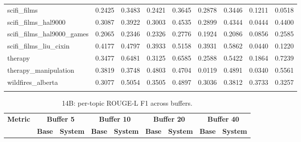 \begin{landscape}
\begin{longtable}{@{}p{3.8cm}cccccccc@{}}
scifi\_films & 0.2425 & 0.3483 & 0.2421 & 0.3645 & 0.2878 & 0.3446 & 0.1211 & 0.0518 \\
scifi\_films\_hal9000 & 0.3087 & 0.3922 & 0.3003 & 0.4535 & 0.2899 & 0.4344 & 0.0444 & 0.4400 \\
scifi\_films\_hal9000\_games & 0.2065 & 0.2346 & 0.2326 & 0.2776 & 0.1924 & 0.2086 & 0.0856 & 0.2585 \\
scifi\_films\_liu\_cixin & 0.4177 & 0.4797 & 0.3933 & 0.5158 & 0.3931 & 0.5862 & 0.0440 & 0.1220 \\
therapy & 0.3477 & 0.6481 & 0.3125 & 0.6585 & 0.2588 & 0.5422 & 0.1864 & 0.7239 \\
therapy\_manipulation & 0.3819 & 0.3748 & 0.4803 & 0.4704 & 0.0119 & 0.4891 & 0.0340 & 0.5561 \\
wildfires\_alberta & 0.3077 & 0.5054 & 0.3505 & 0.4897 & 0.3036 & 0.3812 & 0.3733 & 0.3257 \\
\botrule
\end{longtable}
\begin{longtable}{@{}p{3.8cm}cccccccc@{}}
\caption{14B: per-topic ROUGE-L F1 across buffers.}\label{tab:app_14b_rougel_topics}\\

\toprule
\textbf{Metric} & \multicolumn{2}{c}{\textbf{Buffer 5}} & \multicolumn{2}{c}{\textbf{Buffer 10}} & \multicolumn{2}{c}{\textbf{Buffer 20}} & \multicolumn{2}{c}{\textbf{Buffer 40}} \\
\cmidrule(lr){2-3}\cmidrule(lr){4-5}\cmidrule(lr){6-7}\cmidrule(lr){8-9}
 & \textbf{Base} & \textbf{System} & \textbf{Base} & \textbf{System} & \textbf{Base} & \textbf{System} & \textbf{Base} & \textbf{System} \\
\midrule
\endfirsthead


\end{longtable}
\end{landscape}
